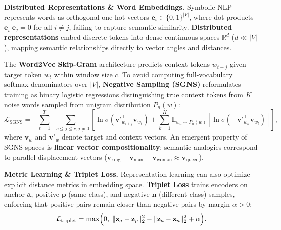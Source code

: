 \documentclass[11pt,a4paper]{article}
\begin{document}
	\textbf{Distributed Representations \& Word Embeddings.} Symbolic NLP represents words as orthogonal one-hot vectors $\mathbf{e}_i \in \{0, 1\}^{|V|}$, where dot products $\mathbf{e}_i^{\!\top}\mathbf{e}_j = 0$ for all $i \neq j$, failing to capture semantic similarity. \textbf{Distributed representations} \parencite{mikolov2013} embed discrete tokens into dense continuous spaces $\mathbb{R}^d$ ($d \ll |V|$), mapping semantic relationships directly to vector angles and distances.
	
	The \textbf{Word2Vec Skip-Gram} architecture predicts context tokens $w_{t+j}$ given target token $w_t$ within window size $c$. To avoid computing full-vocabulary softmax denominators over $|V|$, \textbf{Negative Sampling (SGNS)} reformulates training as binary logistic regressions distinguishing true context tokens from $K$ noise words sampled from unigram distribution $P_n(w)$:
	\begin{equation}
		\mathcal{L}_{\mathrm{SGNS}} = -\sum_{t=1}^{T} \sum_{-c \le j \le c, j \neq 0} \left[ \ln \sigma\!\left(\mathbf{v}'^{\!\top}_{w_{t+j}} \mathbf{v}_{w_t}\right) + \sum_{k=1}^{K} \mathbb{E}_{w_n \sim P_n(w)} \left[ \ln \sigma\!\left(-\mathbf{v}'^{\!\top}_{w_n} \mathbf{v}_{w_t}\right) \right] \right],
	\end{equation}
	where $\mathbf{v}_w$ and $\mathbf{v}'_w$ denote target and context vectors. An emergent property of SGNS spaces is \textbf{linear vector compositionality}: semantic analogies correspond to parallel displacement vectors ($\mathbf{v}_{\text{king}} - \mathbf{v}_{\text{man}} + \mathbf{v}_{\text{woman}} \approx \mathbf{v}_{\text{queen}}$).
	
	\textbf{Metric Learning \& Triplet Loss.} Representation learning can also optimize explicit distance metrics in embedding space. \textbf{Triplet Loss} trains encoders on anchor $\mathbf{a}$, positive $\mathbf{p}$ (same class), and negative $\mathbf{n}$ (different class) samples, enforcing that positive pairs remain closer than negative pairs by margin $\alpha > 0$:
	\begin{equation}
		\mathcal{L}_{\mathrm{triplet}} = \max\Bigl(0,\; \|\mathbf{z}_a - \mathbf{z}_p\|_2^2 - \|\mathbf{z}_a - \mathbf{z}_n\|_2^2 + \alpha\Bigr).
	\end{equation}

	\begin{practicebox}

	\end{practicebox}
	
\end{document}
